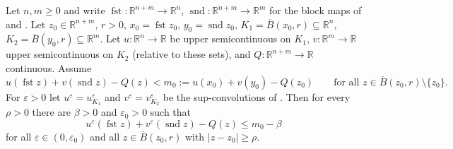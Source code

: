 \begin{lemma}
Let $n,m\ge0$ and write $\operatorname{fst}:\mathbb R^{n+m}\to\mathbb R^n$, $\operatorname{snd}:\mathbb R^{n+m}\to\mathbb R^m$ for the block maps of  and . Let $z_0\in\mathbb R^{n+m}$, $r>0$, $x_0=\operatorname{fst}z_0$, $y_0=\operatorname{snd}z_0$, $K_1=\overline B(x_0,r)\subseteq\mathbb R^n$, $K_2=\overline B(y_0,r)\subseteq\mathbb R^m$. Let $u:\mathbb R^n\to\mathbb R$ be upper semicontinuous on $K_1$, $v:\mathbb R^m\to\mathbb R$ upper semicontinuous on $K_2$ (relative to these sets), and $Q:\mathbb R^{n+m}\to\mathbb R$ continuous. Assume
\[
u(\operatorname{fst}z)+v(\operatorname{snd}z)-Q(z)<m_0:=u(x_0)+v(y_0)-Q(z_0)\qquad\text{for all }z\in\overline B(z_0,r)\setminus\{z_0\}.
\]
For $\varepsilon>0$ let $u^\varepsilon=u^\varepsilon_{K_1}$ and $v^\varepsilon=v^\varepsilon_{K_2}$ be the sup-convolutions of . Then for every $\rho>0$ there are $\beta>0$ and $\varepsilon_0>0$ such that
\[
u^\varepsilon(\operatorname{fst}z)+v^\varepsilon(\operatorname{snd}z)-Q(z)\le m_0-\beta
\]
for all $\varepsilon\in(0,\varepsilon_0)$ and all $z\in\overline B(z_0,r)$ with $|z-z_0|\ge\rho$.
\end{lemma}
